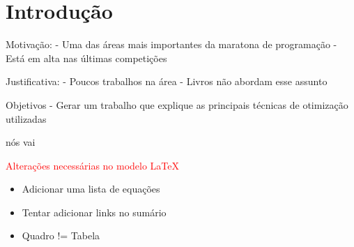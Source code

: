 \chapter{Introdu\c{c}\~ao}
\label{chap:introducao}

Motivação:
- Uma das áreas mais importantes da maratona de programação
- Está em alta nas últimas competições


Justificativa:
- Poucos trabalhos  na área
- Livros não abordam esse assunto


Objetivos
- Gerar um trabalho que explique as principais técnicas de otimização utilizadas

nós vai 

\textcolor{red}{Alterações necessárias no modelo \LaTeX}

\begin{itemize}
	\item Adicionar uma lista de equações
	\item Tentar adicionar links no sumário
	\item Quadro != Tabela
\end{itemize}